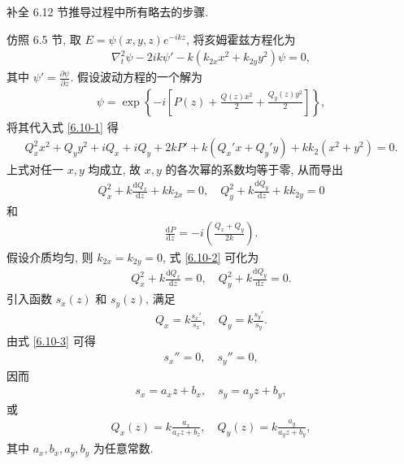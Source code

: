 \documentclass[twoside]{note}
\begin{document}
\begin{exe}
    补全 6.12 节推导过程中所有略去的步骤.
\end{exe}
\begin{pf}
    仿照 6.5 节, 取 $E=\psi(x,y,z)e^{-ikz}$, 将亥姆霍兹方程化为
    \begin{align}
        \label{6.10-1}
        \nabla_t^2\psi-2ik\psi'-k(k_{2x}x^2+k_{2y}y^2)\psi=0,
    \end{align}
    其中 $\psi'=\frac{\partial\psi}{\partial z}$.
    假设波动方程的一个解为
    \begin{align}
        \psi=\exp\left\{-i\left[P(z)+\frac{Q(z)x^2}{2}+\frac{Q_y(z)y^2}{2}\right]\right\},
    \end{align}
    将其代入式 \eqref{6.10-1} 得
    \begin{align}
        Q_x^2x^2+Q_yy^2+iQ_x+iQ_y+2kP'+k(Q_x'x+Q_y'y)+kk_2(x^2+y^2)=0.
    \end{align}
    上式对任一 $x,y$ 均成立, 故 $x,y$ 的各次幂的系数均等于零, 从而导出
    \begin{align}
        \label{6.10-2}
        Q_x^2+k\frac{\mathrm{d}Q_x}{\mathrm{d}z}+kk_{2x}=0,\quad Q_y^2+k\frac{\mathrm{d}Q_y}{\mathrm{d}z}+kk_{2y}=0
    \end{align}
    和
    \begin{align}
        \label{6.10-5}
        \frac{\mathrm{d}P}{\mathrm{d}z}=-i\left(\frac{Q_x+Q_y}{2k}\right).
    \end{align}
    假设介质均匀, 则 $k_{2x}=k_{2y}=0$, 式 \eqref{6.10-2} 可化为
    \begin{align}
        \label{6.10-3}
        Q_x^2+k\frac{\mathrm{d}Q_x}{\mathrm{d}z}=0,\quad Q_y^2+k\frac{\mathrm{d}Q_y}{\mathrm{d}z}=0.
    \end{align}
    引入函数 $s_x(z)$ 和 $s_y(z)$, 满足
    \begin{align}
        Q_x=k\frac{s_x'}{s_x},\quad Q_y=k\frac{s_y'}{s_y}.
    \end{align}
    由式 \eqref{6.10-3} 可得
    \begin{align}
        s_x''=0,\quad s_y''=0,
    \end{align}
    因而
    \begin{align}
        s_x=a_xz+b_x,\quad s_y=a_yz+b_y,
    \end{align}
    或
    \begin{align}
        \label{6.10-4}
        Q_x(z)=k\frac{a_x}{a_xz+b_z},\quad Q_y(z)=k\frac{a_y}{a_yz+b_y},
    \end{align}
    其中 $a_x,b_x,a_y,b_y$ 为任意常数.

\end{pf}
\end{document}
